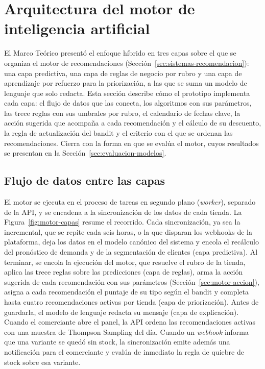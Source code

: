 \section{Arquitectura del motor de inteligencia artificial}
\label{sec:motor-ia}

El Marco Teórico presentó el enfoque híbrido en tres capas sobre el que se organiza el motor de recomendaciones (Sección~\ref{sec:sistemas-recomendacion}): una capa predictiva, una capa de reglas de negocio por rubro y una capa de aprendizaje por refuerzo para la priorización, a las que se suma un modelo de lenguaje que solo redacta.
Esta sección describe cómo el prototipo implementa cada capa: el flujo de datos que las conecta, los algoritmos con sus parámetros, las trece reglas con sus umbrales por rubro, el calendario de fechas clave, la acción sugerida que acompaña a cada recomendación y el cálculo de su descuento, la regla de actualización del bandit y el criterio con el que se ordenan las recomendaciones. Cierra con la forma en que se evalúa el motor, cuyos resultados se presentan en la Sección~\ref{sec:evaluacion-modelos}.

\subsection{Flujo de datos entre las capas}
\label{sec:motor-flujo}

El motor se ejecuta en el proceso de tareas en segundo plano (\emph{worker}), separado de la API, y se encadena a la sincronización de los datos de cada tienda. La Figura~\ref{fig:motor-capas} resume el recorrido. Cada sincronización, ya sea la incremental, que se repite cada seis horas, o la que disparan los webhooks de la plataforma, deja los datos en el modelo canónico del sistema y encola el recálculo del pronóstico de demanda y de la segmentación de clientes (capa predictiva). Al terminar, se encola la ejecución del motor, que resuelve el rubro de la tienda, aplica las trece reglas sobre las predicciones (capa de reglas), arma la acción sugerida de cada recomendación con sus parámetros (Sección~\ref{sec:motor-accion}), asigna a cada recomendación el puntaje de su tipo según el bandit y completa hasta cuatro recomendaciones activas por tienda (capa de priorización). Antes de guardarla, el modelo de lenguaje redacta su mensaje (capa de explicación). Cuando el comerciante abre el panel, la API ordena las recomendaciones activas con una muestra de Thompson Sampling del día. Cuando un \emph{webhook} informa que una variante se quedó sin stock, la sincronización emite además una notificación para el comerciante y evalúa de inmediato la regla de quiebre de stock sobre esa variante.

